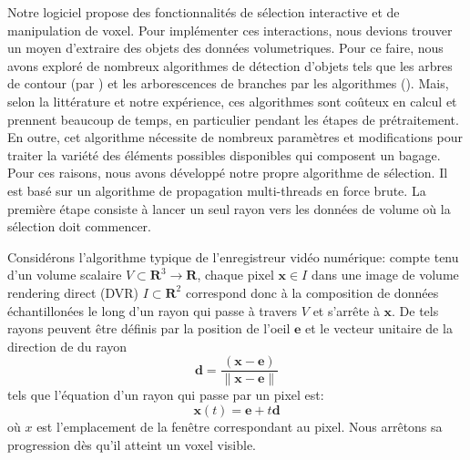 Notre logiciel propose des fonctionnalités de sélection interactive et de manipulation de voxel. Pour implémenter ces interactions, nous devions trouver un moyen d'extraire des objets des données volumetriques. Pour ce faire, nous avons exploré de nombreux algorithmes de détection d’objets tels que les arbres de contour (par \cite{carr_computing_2000}) et les arborescences de branches par les algorithmes (\cite{pascucci_multi-resolution_2004}). Mais, selon la littérature et notre expérience, ces algorithmes sont coûteux en calcul et prennent beaucoup de temps, en particulier pendant les étapes de prétraitement. En outre, cet algorithme nécessite de nombreux paramètres et modifications pour traiter la variété des éléments possibles disponibles qui composent un bagage. Pour ces raisons, nous avons développé notre propre algorithme de sélection. Il est basé sur un algorithme de propagation multi-threads en force brute. La première étape consiste à lancer un seul rayon vers les données de volume où la sélection doit commencer.

Considérons l'algorithme typique de l'enregistreur vidéo numérique: compte tenu d'un volume scalaire $V \subset \mathbf{R}^3 \rightarrow \mathbf{R}$, chaque pixel $\mathbf{x} \in I$ dans une image de volume rendering direct (DVR) $I \subset \mathbf{R}^2$ correspond donc à la composition de données échantillonées le long d'un rayon qui passe à travers $V$ et s'arrête à $\mathbf{x}$. De tels rayons peuvent être définis par la position de l'oeil $\mathbf{e}$ et le vecteur unitaire de la direction de du rayon
\begin{equation}
\mathbf{d} = \frac{ (\mathbf{x} - \mathbf{e}) }{ \| \mathbf{x} - \mathbf{e} \| }
\end{equation}
tels que l'équation d'un rayon qui passe par un pixel est:
\begin{equation}
\mathbf{x}(t) =  \mathbf{e} + t\mathbf{d}
\end{equation}
où $x$ est l'emplacement de la fenêtre correspondant au pixel.
  Nous arrêtons sa progression dès qu’il atteint un voxel visible. 

